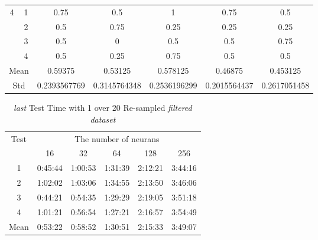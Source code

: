 \documentclass[draft,dvipsnames]{drexel-thesis}
\begin{document}
\begin{thesis}
\begin{table}[!t]
\begin{tabular}{|c|c|c|c|c|c|c|}
\multirow{4}{*}{4}    & 1                   & 0.75         & 0.5          & 1            & 0.75         & 0.5          \\ \cline{2-7} 
                      & 2                   & 0.5          & 0.75         & 0.25         & 0.25         & 0.25         \\ \cline{2-7} 
                      & 3                   & 0.5          & 0            & 0.5          & 0.5          & 0.75         \\ \cline{2-7} 
                      & 4                   & 0.5          & 0.25         & 0.75         & 0.5          & 0.5          \\ \hline
\multicolumn{2}{|c|}{Mean}                  & 0.59375      & 0.53125      & 0.578125     & 0.46875      & 0.453125     \\ \hline
\multicolumn{2}{|c|}{Std}                   & 0.2393567769 & 0.3145764348 & 0.2536196299 & 0.2015564437 & 0.2617051458 \\ \hline
\end{tabular}
\end{table}

\begin{table}[!t]
\centering
\caption{{\em last} Test Time with 1 over 20 Re-sampled {\em filtered dataset}}
\label{tbl:last_1_20_time}
\begin{tabular}{|c|c|c|c|c|c|}
\hline
\multirow{2}{*}{Test}      & \multicolumn{5}{c|}{The number of neurans}                                                                                                               \\ \cline{2-6} 
                           & 16                           & 32                           & 64                           & 128                          & 256                          \\ \hline
1                          & 0:45:44                      & 1:00:53                      & 1:31:39                      & 2:12:21                      & 3:44:16                      \\ \hline
2                          & 1:02:02                      & 1:03:06                      & 1:34:55                      & 2:13:50                      & 3:46:06                      \\ \hline
3                          & 0:44:21                      & 0:54:35                      & 1:29:29                      & 2:19:05                      & 3:51:18                      \\ \hline
4                          & 1:01:21                      & 0:56:54                      & 1:27:21                      & 2:16:57                      & 3:54:49                      \\ \hline
\multicolumn{1}{|l|}{Mean} & \multicolumn{1}{l|}{0:53:22} & \multicolumn{1}{l|}{0:58:52} & \multicolumn{1}{l|}{1:30:51} & \multicolumn{1}{l|}{2:15:33} & \multicolumn{1}{l|}{3:49:07} \\ \hline
\end{tabular}
\end{table}


\end{thesis}
\end{document}
